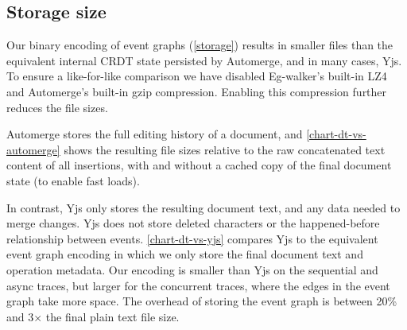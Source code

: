 \documentclass[sigplan,10pt]{acmart}
\newcommand{\algname}{Eg-walker\xspace}
\begin{document}
\subsection{Storage size}

Our binary encoding of event graphs (\autoref{storage}) results in smaller files than the equivalent internal CRDT state persisted by Automerge, and in many cases, Yjs.
To ensure a like-for-like comparison we have disabled \algname's built-in LZ4 and Automerge's built-in gzip compression. Enabling this compression further reduces the file sizes.


Automerge stores the full editing history of a document, and \autoref{chart-dt-vs-automerge} shows the resulting file sizes relative to the raw concatenated text content of all insertions, with and without a cached copy of the final document state (to enable fast loads).


In contrast, Yjs only stores the resulting document text, and any data needed to merge changes.
Yjs does not store deleted characters or the happened-before relationship between events.
\autoref{chart-dt-vs-yjs} compares Yjs to the equivalent event graph encoding in which we only store the final document text and operation metadata.
Our encoding is smaller than Yjs on the sequential and async traces, but larger for the concurrent traces, where the edges in the event graph take more space.
The overhead of storing the event graph is between 20\% and 3$\times$ the final plain text file size.
\end{document}
